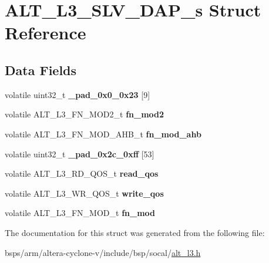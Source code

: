 \hypertarget{structALT__L3__SLV__DAP__s}{}\section{A\+L\+T\+\_\+\+L3\+\_\+\+S\+L\+V\+\_\+\+D\+A\+P\+\_\+s Struct Reference}
\label{structALT__L3__SLV__DAP__s}
\subsection*{Data Fields}
\begin{DoxyCompactItemize}
\item 
\mbox{\label{structALT__L3__SLV__DAP__s_a429ee5228d4f732b55ef01cdbba44673}} 
volatile uint32\+\_\+t {\bfseries \+\_\+pad\+\_\+0x0\+\_\+0x23} \mbox{[}9\mbox{]}
\item 
\mbox{\label{structALT__L3__SLV__DAP__s_ade5851918e00688c2d59559466933b3f}} 
volatile A\+L\+T\+\_\+\+L3\+\_\+\+F\+N\+\_\+\+M\+O\+D2\+\_\+t {\bfseries fn\+\_\+mod2}
\item 
\mbox{\label{structALT__L3__SLV__DAP__s_aa8361027513f18d2e02ff3fd38331935}} 
volatile A\+L\+T\+\_\+\+L3\+\_\+\+F\+N\+\_\+\+M\+O\+D\+\_\+\+A\+H\+B\+\_\+t {\bfseries fn\+\_\+mod\+\_\+ahb}
\item 
\mbox{\label{structALT__L3__SLV__DAP__s_aad4cc70416765f4bdf085bdec40fbe28}} 
volatile uint32\+\_\+t {\bfseries \+\_\+pad\+\_\+0x2c\+\_\+0xff} \mbox{[}53\mbox{]}
\item 
\mbox{\label{structALT__L3__SLV__DAP__s_a2177f89351292c58b4673778817ab031}} 
volatile A\+L\+T\+\_\+\+L3\+\_\+\+R\+D\+\_\+\+Q\+O\+S\+\_\+t {\bfseries read\+\_\+qos}
\item 
\mbox{\label{structALT__L3__SLV__DAP__s_a31ae054f733756c4225827b0caeddcb3}} 
volatile A\+L\+T\+\_\+\+L3\+\_\+\+W\+R\+\_\+\+Q\+O\+S\+\_\+t {\bfseries write\+\_\+qos}
\item 
\mbox{\label{structALT__L3__SLV__DAP__s_af7bb280606fe051c6e58752a28e6c441}} 
volatile A\+L\+T\+\_\+\+L3\+\_\+\+F\+N\+\_\+\+M\+O\+D\+\_\+t {\bfseries fn\+\_\+mod}
\end{DoxyCompactItemize}


The documentation for this struct was generated from the following file\+:\begin{DoxyCompactItemize}
\item 
bsps/arm/altera-\/cyclone-\/v/include/bsp/socal/\mbox{\hyperlink{alt__l3_8h}{alt\+\_\+l3.\+h}}\end{DoxyCompactItemize}
